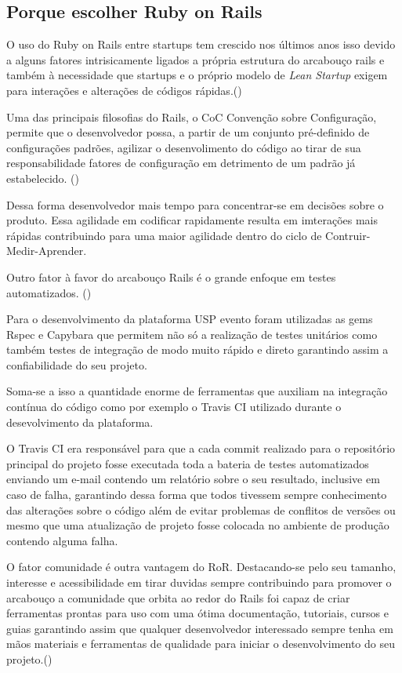 \subsection{Porque escolher Ruby on Rails }
\par O uso do Ruby on Rails entre startups tem crescido  nos últimos anos isso devido a alguns fatores intrisicamente ligados a própria estrutura do arcabouço rails e também à necessidade que startups e o próprio modelo de \emph{Lean Startup} exigem para interações e alterações de códigos rápidas.(\cite{lilia:16})
\par Uma das principais filosofias do Rails, o CoC \- Convenção sobre Configuração, permite que o desenvolvedor possa, a partir de um conjunto pré-definido de configurações padrões, agilizar o desenvolimento do código ao tirar de sua responsabilidade fatores de configuração em detrimento de um padrão já estabelecido. (\cite{morrice:15})
\par  Dessa forma desenvolvedor mais tempo para concentrar-se em decisões sobre o produto. Essa agilidade em codificar rapidamente resulta em imterações mais rápidas contribuindo para uma maior agilidade dentro do ciclo de Contruir-Medir-Aprender.
\par Outro fator à favor do arcabouço Rails é o grande enfoque em testes automatizados. (\cite{morrice:15}) 
\par Para o desenvolvimento da plataforma USP evento foram utilizadas as  gems Rspec e Capybara que permitem não só  a realização de testes unitários como também testes de integração de modo muito rápido e direto garantindo assim a confiabilidade  do seu projeto. 
\par Soma-se a isso a quantidade enorme de ferramentas que auxiliam na integração contínua do código como por exemplo o Travis CI utilizado  durante o desevolvimento da plataforma. 
\par O Travis CI era responsável para que a cada commit realizado para o repositório principal do projeto fosse executada toda a bateria de testes automatizados enviando um e-mail contendo um relatório sobre o seu resultado, inclusive em caso de falha, garantindo dessa forma que todos tivessem sempre conhecimento das alterações sobre o código além de evitar  problemas de conflitos de versões ou mesmo que uma atualização de projeto fosse colocada no ambiente de produção contendo alguma falha.
\par O fator comunidade é outra vantagem do  RoR. Destacando-se pelo seu tamanho, interesse e acessibilidade em tirar duvidas sempre contribuindo para promover o arcabouço  a comunidade que orbita ao redor do Rails foi capaz de criar ferramentas prontas para uso com uma ótima documentação, tutoriais, cursos e guias garantindo assim que qualquer desenvolvedor interessado sempre tenha em mãos materiais e ferramentas de qualidade para iniciar o desenvolvimento do seu projeto.(\cite{lilia:16})
